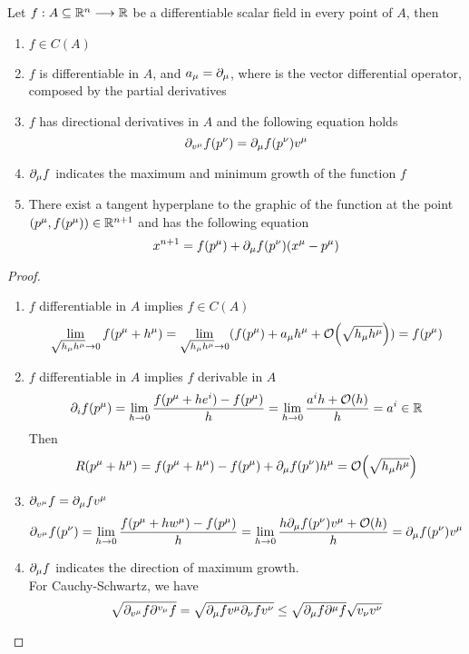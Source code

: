 \documentclass[../complete.tex]{subfiles}
\begin{document}
\begin{thm}
	Let $f:A\subseteq\mathbb{R}^n\overset{}{\longrightarrow}\mathbb{R}$ be a differentiable scalar field in every point of $A$, then
	\begin{enumerate}
	\item $f\in C(A)$
	\item $f$ is differentiable in $A$, and $a_\mu=\partial_\mu$, where is the vector differential operator, composed by the partial derivatives
	\item $f$ has directional derivatives in $A$ and the following equation holds
		\begin{equation*}
			\partial_{v^\mu}f(p^\nu)=\partial_\mu f(p^\nu)v^\mu
		\end{equation*}
	\item $\partial_\mu{f}$ indicates the maximum and minimum growth of the function $f$
	\item There exist a tangent hyperplane to the graphic of the function at the point $(p^\mu,f(p^\mu))\in\mathbb{R}^{n+1}$ and has the following equation
		\begin{equation*}
			x^{n+1}=f(p^\mu)+\partial_\mu f(p^\nu)(x^\mu-p^\mu)
		\end{equation*}
	\end{enumerate}
\end{thm}
\begin{proof}
	\begin{enumerate}
	\item $f$ differentiable in $A$ implies $f\in C(A)$
		\begin{equation*}
			\lim_{\sqrt{h_\mu h^\mu}\to0}f(p^\mu+h^\mu)=\lim_{\sqrt{h_\mu h^\mu}\to0}(f(p^\mu)+a_\mu h^\mu+\order{\sqrt{h_\mu h^\mu}})=f(p^\mu)
		\end{equation*}
	\item $f$ differentiable in $A$ implies $f$ derivable in $A$
		\begin{equation*}
			\partial_i f(p^\mu)=\lim_{h\to0}\frac{f(p^\mu+he^i)-f(p^\mu)}{h}=\lim_{h\to0}\frac{a^ih+\order{h}}{h}=a^i\in\R
		\end{equation*}
		Then
		\begin{equation*}
			R(p^\mu+h^\mu)=f(p^\mu+h^\mu)-f(p^\mu)+\del_\mu f(p^\nu)h^\mu=\order{\sqrt{h_\mu h^\mu}}
		\end{equation*}
	\item $\partial_{v^\mu}f=\partial_\mu fv^\mu$
		\begin{equation*}
			\del_{v^\mu}f(p^\nu)=\lim_{h\to0}\frac{f(p^\mu+hw^\mu)-f(p^\mu)}{h}=\lim_{h\to0}\frac{h\del_\mu f(p^\nu)v^\mu+\order{h}}{h}=\del_\mu f(p^\nu)v^\mu
		\end{equation*}
	\item $\partial_\mu f$ indicates the direction of maximum growth.\\
		For Cauchy-Schwartz, we have
		\begin{equation*}
			\sqrt{\partial_{v^\mu}{f}\partial^{v_\mu}f}=\sqrt{\partial_\mu fv^\mu \partial_\nu fv^\nu}\le\sqrt{\partial_\mu f\partial^\mu f}\sqrt{v_\nu v^\nu}
		\end{equation*}
	\end{enumerate}
\end{proof}
\end{document}
